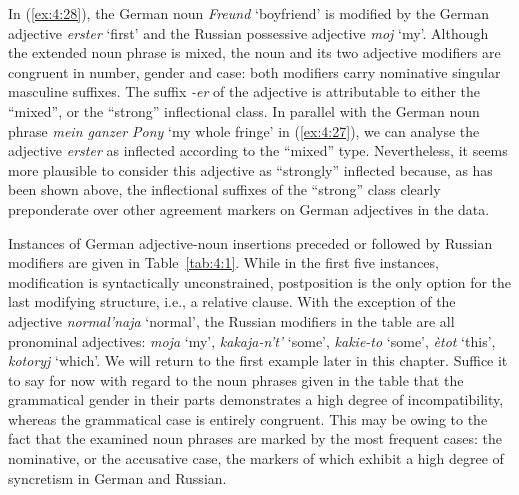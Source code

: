 \noindent In (\ref{ex:4:28}), the German noun \textit{Freund} `boyfriend' is modified by the German adjective \textit{erster} `first' and the Russian possessive adjective \textit{moj} `my'. Although the extended noun phrase is mixed, the noun and its two adjective modifiers are congruent in number, gender and case: both modifiers carry nominative singular masculine suffixes. The suffix \textit{-er} of the adjective is attributable to either the “mixed”, or the “strong” inflectional class. In parallel with the German noun phrase \textit{mein ganzer Pony} `my whole fringe' in (\ref{ex:4:27}), we can analyse the adjective \textit{erster} as inflected according to the “mixed” type. Nevertheless, it seems more plausible to consider this adjective as “strongly” inflected because, as has been shown above, the inflectional suffixes of the “strong” class clearly preponderate over other agreement markers on German adjectives in the data.

Instances of German adjective-noun insertions preceded or followed by Russian modifiers are given in Table~\ref{tab:4:1}. While in the first five instances, modification is syntactically unconstrained, postposition is the only option for the last modifying structure, i.e., a relative clause. With the exception of the adjective \textit{normal'naja} `normal', the Russian modifiers in the table are all pronominal adjectives: \textit{moja} `my', \textit{kakaja-n't'} `some', \textit{kakie-to} `some', \textit{ètot} `this', \textit{kotoryj} `which'. We will return to the first example later in this chapter. Suffice it to say for now with regard to the noun phrases given in the table that the grammatical gender in their parts demonstrates a high degree of incompatibility, whereas the grammatical case is entirely congruent. This may be owing to the fact that the examined noun phrases are marked by the most frequent cases: the nominative, or the accusative case, the markers of which exhibit a high degree of syncretism in German and Russian.

